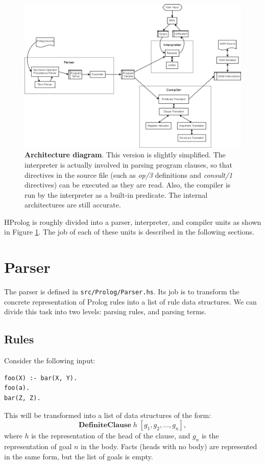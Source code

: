 \documentclass[11pt]{report}
\begin{document}
\begin{figure}[htb]
\centering
\includegraphics[width=\linewidth]{Architecture.png}
\caption{
  \textbf{Architecture diagram}. This version is slightly simplified. The interpreter is actually involved in parsing program clauses, so that directives in the source file (such as \emph{op/3} definitions and \emph{consult/1} directives) can be executed as they are read. Also, the compiler is run by the interpreter as a built-in predicate. The internal architectures are still accurate.
}
\label{fig:architecture}
\end{figure}

HProlog is roughly divided into a parser, interpreter, and compiler units as shown in Figure \ref{fig:architecture}. The job of each of these units is described in the following sections.


\section{Parser}

The parser is defined in \texttt{src/Prolog/Parser.hs}. Its job is to transform the concrete representation of Prolog rules into a list of rule data structures. We can divide this task into two levels: parsing rules, and parsing terms.

\subsection{Rules}

Consider the following input:
\begin{verbatim}
foo(X) :- bar(X, Y).
foo(a).
bar(Z, Z).
\end{verbatim}
This will be transformed into a list of data structures of the form:
\[
\mathbf{DefiniteClause} \; h \; [g_1, g_2, \ldots, g_n],
\]
where $h$ is the representation of the head of the clause, and $g_n$ is the representation of goal $n$ in the body. Facts (heads with no body) are represented in the same form, but the list of goals is empty.
\end{document}
